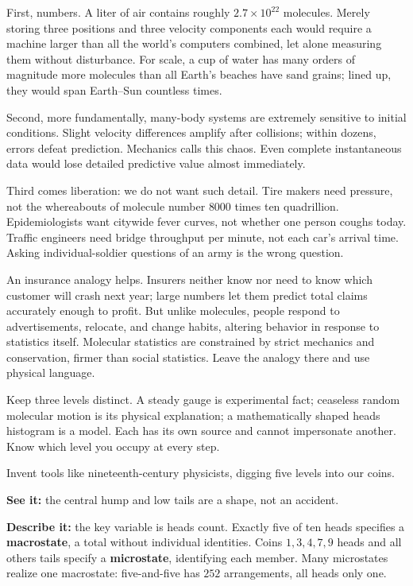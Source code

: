 First, numbers. A liter of air contains roughly \(2.7\times10^{22}\) molecules. Merely storing three positions and three velocity components each would require a machine larger than all the world's computers combined, let alone measuring them without disturbance. For scale, a cup of water has many orders of magnitude more molecules than all Earth's beaches have sand grains; lined up, they would span Earth--Sun countless times.

Second, more fundamentally, many-body systems are extremely sensitive to initial conditions. Slight velocity differences amplify after collisions; within dozens, errors defeat prediction. Mechanics calls this chaos. Even complete instantaneous data would lose detailed predictive value almost immediately.

Third comes liberation: we do not want such detail. Tire makers need pressure, not the whereabouts of molecule number \(8000\) times ten quadrillion. Epidemiologists want citywide fever curves, not whether one person coughs today. Traffic engineers need bridge throughput per minute, not each car's arrival time. Asking individual-soldier questions of an army is the wrong question.

An insurance analogy helps. Insurers neither know nor need to know which customer will crash next year; large numbers let them predict total claims accurately enough to profit. But unlike molecules, people respond to advertisements, relocate, and change habits, altering behavior in response to statistics itself. Molecular statistics are constrained by strict mechanics and conservation, firmer than social statistics. Leave the analogy there and use physical language.

Keep three levels distinct. A steady gauge is experimental fact; ceaseless random molecular motion is its physical explanation; a mathematically shaped heads histogram is a model. Each has its own source and cannot impersonate another. Know which level you occupy at every step.


Invent tools like nineteenth-century physicists, digging five levels into our coins.

\textbf{See it:} the central hump and low tails are a shape, not an accident.

\textbf{Describe it:} the key variable is heads count. Exactly five of ten heads specifies a \textbf{macrostate}, a total without individual identities. Coins \(1,3,4,7,9\) heads and all others tails specify a \textbf{microstate}, identifying each member. Many microstates realize one macrostate: five-and-five has \(252\) arrangements, all heads only one.

